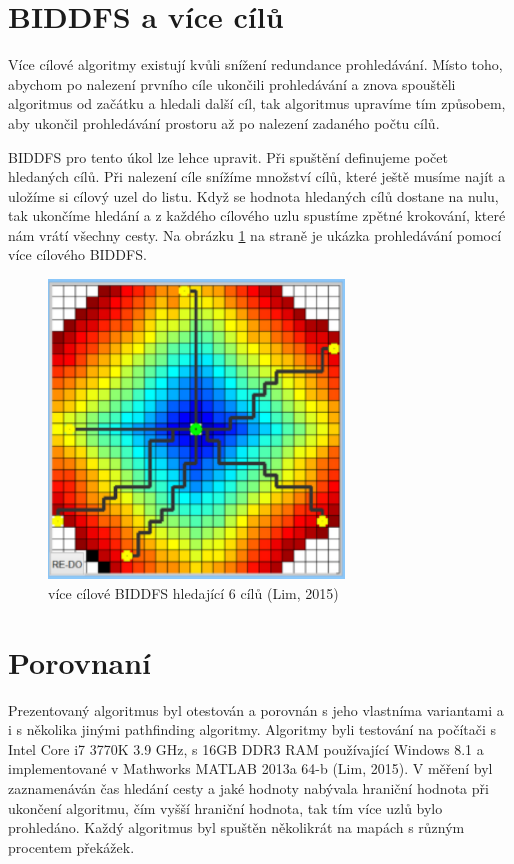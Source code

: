 \documentclass[12pt]{report}
\begin{document}
	
	\section*{BIDDFS a více cílů}
	
	Více cílové algoritmy existují kvůli snížení redundance prohledávání. Místo toho, abychom po nalezení prvního cíle ukončili prohledávání a znova spouštěli algoritmus od začátku a hledali další cíl, tak algoritmus upravíme tím způsobem, aby ukončil prohledávání prostoru až po nalezení zadaného počtu cílů.
	
	BIDDFS pro tento úkol lze lehce upravit. Při spuštění definujeme počet hledaných cílů. Při nalezení cíle snížíme množství cílů, které ještě musíme najít a uložíme si cílový uzel do listu. Když se hodnota hledaných cílů dostane na nulu, tak ukončíme hledání a z každého cílového uzlu spustíme zpětné krokování, které nám vrátí všechny cesty. Na obrázku \ref{fig:mg-biddfs} na straně \pageref{fig:mg-biddfs} je ukázka prohledávání pomocí více cílového BIDDFS.
	
	\begin{figure}[h]
		\centering
		\includegraphics[width=0.7\textwidth]{img/mg-biddfs}
		\caption{více cílové BIDDFS hledající 6 cílů (Lim, 2015)}
		\label{fig:mg-biddfs}
	\end{figure}
	
	
	\newpage
	
	\section*{Porovnaní}
	
	Prezentovaný algoritmus byl otestován a porovnán s jeho vlastníma variantami a i s několika jinými pathfinding algoritmy. Algoritmy byli testování na počítači s Intel Core i7 3770K 3.9 GHz, s 16GB DDR3 RAM používající Windows 8.1 a implementované v Mathworks MATLAB 2013a 64-b (Lim, 2015). V měření byl zaznamenáván čas hledání cesty a jaké hodnoty nabývala hraniční hodnota při ukončení algoritmu, čím vyšší hraniční hodnota, tak tím více uzlů bylo prohledáno. Každý algoritmus byl spuštěn několikrát na mapách s různým procentem překážek. 
	
\end{document}
